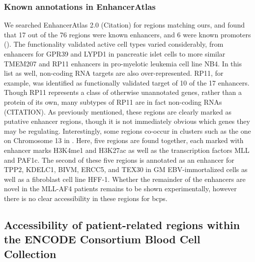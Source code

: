 
\subsubsection{Known annotations in EnhancerAtlas} 

We searched EnhancerAtlas 2.0 (Citation) for regions matching ours, and found that 17 out of the 76 regions were known enhancers, and 6 were known promoters (). The functionality validated active cell types varied considerably, from enhancers for GPR39 and LYPD1 in pancreatic islet cells to more similar TMEM207 and RP11 enhancers in pro-myelotic leukemia cell line NB4. In this list as well, non-coding RNA targets are also over-represented. RP11, for example, was identified as functionally validated target of 10 of the 17 enhancers. Though RP11 represents a class of otherwise unannotated genes, rather than a protein of its own, many subtypes of RP11 are in fact non-coding RNAs (CITATION). As previously mentioned, these regions are clearly marked as putative enhancer regions, though it is not immediately obvious which genes they may be regulating. Interestingly, some regions co-occur in clusters such as the one on Chromosome 13 in . Here, five regions are found together, each marked with enhancer marks H3K4me1 and H3K27ac as well as the transcription factors MLL and PAF1c. The second of these five regions is annotated as an enhancer for TPP2, KDELC1, BIVM, ERCC5, and TEX30 in GM EBV-immortalized cells as well as a fibroblast cell line HFF-1. Whether the remainder of the enhancers are novel in the MLL-AF4 patients remains to be shown experimentally, however there is no clear accessibility in these regions for \glspl{bcp}. 


\subsection{Accessibility of patient-related regions within the ENCODE Consortium Blood Cell Collection}

